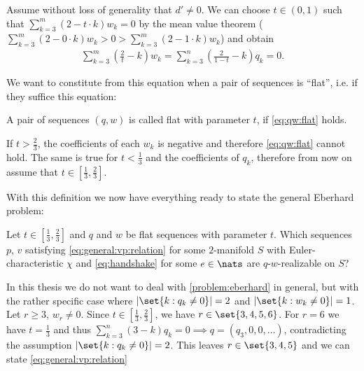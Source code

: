 Assume without loss of generality that $d' \neq 0$. We can choose $t \in (0, 1)$ such that $\sum_{k=3}^m (2 - t \cdot k) w_k = 0$ by the mean value theorem ($\sum_{k=3}^m (2 - 0 \cdot k) w_k > 0 > \sum_{k=3}^m (2 - 1 \cdot k) w_k$) and obtain
\begin{align}
    \sum_{k=3}^m \left(\frac{2}{t} - k \right) w_k = \sum_{k=3}^n \left( \frac{2}{1-t} - k \right) q_k = 0. \label{eq:qw:flat}
\end{align}


We want to constitute from this equation when a pair of sequences is ``flat'', i.e. if they suffice this equation:

\begin{definition}
  A pair of sequences $(q, w)$ is called flat with parameter $t$, if \autoref{eq:qw:flat} holds.
\end{definition}

If $t > \frac{2}{3}$, the coefficients of each $w_k$ is negative and therefore \autoref{eq:qw:flat} cannot hold. The same is true for $t < \frac{1}{3}$ and the coefficients of $q_k$, therefore from now on assume that $t \in \left[\frac{1}{3}, \frac{2}{3}\right]$.

With this definition we now have everything ready to state the general {\sc Eberhard} problem:

\begin{problem}\label{problem:eberhard}
  Let $ t \in \left[\frac{1}{3}, \frac{2}{3}\right]$ and $q$ and $w$ be flat sequences with parameter $t$. Which sequences $p$, $v$ satisfying \autoref{eq:general:vp:relation} for some $2$-manifold $S$ with {\sc Euler}-characteristic $\chi$ and \autoref{eq:handshake} for some $e \in \nats$ are $q$-$w$-realizable on $S$?
\end{problem}

In this thesis we do not want to deal with \autoref{problem:eberhard} in general, but with the rather specific case where $|\set{k : q_k \neq 0}| = 2$ and $|\set{k : w_k \neq 0}| = 1$. Let $r \geq 3$, $w_r \neq 0$. Since $t \in \left[\frac{1}{3}, \frac{2}{3}\right]$, we have $r \in \set{3, 4, 5, 6}$. For $r = 6$ we have $t = \frac{1}{3}$ and thus $\sum_{k=3}^n \left(3 - k \right) q_k = 0 \implies q = (q_3, 0, 0, \dots)$, contradicting the assumption $|\set{k : q_k \neq 0}| = 2$. This leaves $r \in \set{3, 4, 5}$ and we can state \autoref{eq:general:vp:relation} 

